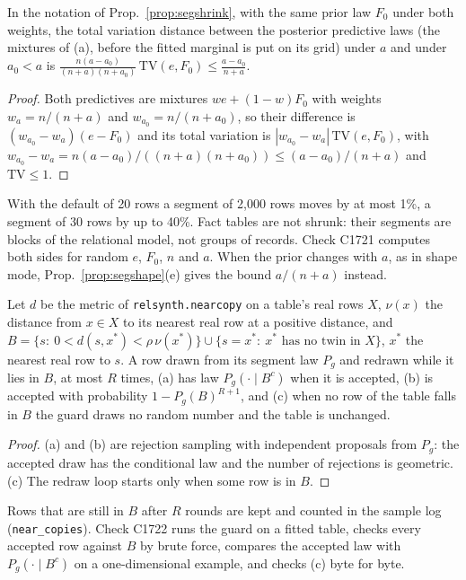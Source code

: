 \setcounter{proposition}{1720}
\begin{proposition}\label{prop:seglarge}
In the notation of Prop.~\ref{prop:segshrink}, with the same prior law $F_0$ under both weights, the total variation distance between the posterior predictive laws (the mixtures of (a), before the fitted marginal is put on its grid) under $a$ and under $a_0<a$ is $\frac{n(a-a_0)}{(n+a)(n+a_0)}\,\mathrm{TV}(e,F_0)\le\frac{a-a_0}{n+a}$.
\end{proposition}
\begin{proof}
Both predictives are mixtures $w e+(1-w)F_0$ with weights $w_a=n/(n+a)$ and $w_{a_0}=n/(n+a_0)$, so their difference is $(w_{a_0}-w_a)(e-F_0)$ and its total variation is $|w_{a_0}-w_a|\,\mathrm{TV}(e,F_0)$, with $w_{a_0}-w_a=n(a-a_0)/((n+a)(n+a_0))\le(a-a_0)/(n+a)$ and $\mathrm{TV}\le1$.
\end{proof}
\noindent With the default of 20 rows a segment of 2{,}000 rows moves by at most 1\%, a segment of 30 rows by up to 40\%. Fact tables are not shrunk: their segments are blocks of the relational model, not groups of records. Check C1721 computes both sides for random $e$, $F_0$, $n$ and $a$. When the prior changes with $a$, as in shape mode, Prop.~\ref{prop:segshape}(e) gives the bound $a/(n+a)$ instead.

\setcounter{proposition}{1721}
\begin{proposition}\label{prop:ncguard}
Let $d$ be the metric of \texttt{relsynth.nearcopy} on a table's real rows $X$, $\nu(x)$ the distance from $x\in X$ to its nearest real row at a positive distance, and $B=\{s:\ 0<d(s,x^*)<\rho\,\nu(x^*)\}\cup\{s=x^*:\ x^*\text{ has no twin in }X\}$, $x^*$ the nearest real row to $s$. A row drawn from its segment law $P_g$ and redrawn while it lies in $B$, at most $R$ times, (a) has law $P_g(\cdot\mid B^c)$ when it is accepted, (b) is accepted with probability $1-P_g(B)^{R+1}$, and (c) when no row of the table falls in $B$ the guard draws no random number and the table is unchanged.
\end{proposition}
\begin{proof}
(a) and (b) are rejection sampling with independent proposals from $P_g$: the accepted draw has the conditional law and the number of rejections is geometric. (c) The redraw loop starts only when some row is in $B$.
\end{proof}
\noindent Rows that are still in $B$ after $R$ rounds are kept and counted in the sample log (\texttt{near\_copies}). Check C1722 runs the guard on a fitted table, checks every accepted row against $B$ by brute force, compares the accepted law with $P_g(\cdot\mid B^c)$ on a one-dimensional example, and checks (c) byte for byte.

